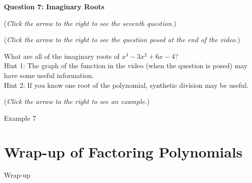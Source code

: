 \documentclass{ximera}
\begin{document}
\textbf{Question 7: Imaginary Roots}
\begin{question}
\begin{flushright}
{\color{blue}(\emph{Click the arrow to the right to see the seventh question.})}
\end{flushright}
\begin{center}
\begin{expandable}
\begin{flushright}
{\color{blue}(\emph{Click the arrow to the right to see the  question
posed at the end of the video.})}
\end{flushright}
\begin{expandable}
What are all of the imaginary roots of $x^3 - 3x^2 + 6x - 4$? \\ Hint 1: The graph of the function in the video (when the question is posed)
may have some useful information. \\  Hint 2: If you know one root of the polynomial, synthetic division may be useful.
\begin{multipleChoice}
\end{multipleChoice}

\begin{flushright}
{\color{blue}(\emph{Click the arrow to the right to see an example.})}
\end{flushright}
\begin{expandable}
\begin{center}
Example 7
\end{center}
\end{expandable}
\end{expandable}
\end{expandable}
\end{center}
\end{question}


\section{Wrap-up of Factoring Polynomials}

\begin{expandable}
Wrap-up
\end{expandable}
\end{document}
